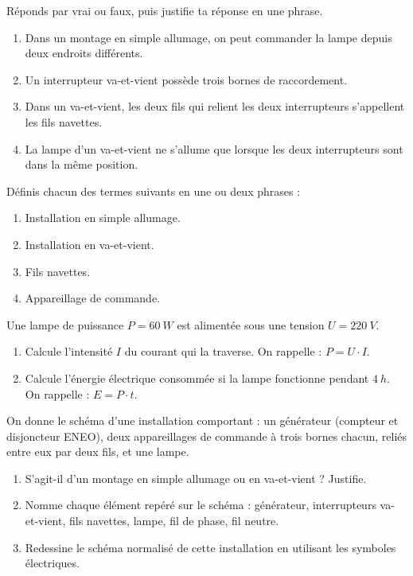 \documentclass[11pt]{article}
\newcounter{popsec}
\newcounter{popsub}
\newcommand{\courssub}[1]{%
  \stepcounter{popsub}%
  \par\vspace{9pt}\noindent{\popxbold\fontsize{11.5}{13}\selectfont\color{popink}{\color{poporange}\thepopsec.\thepopsub}\hspace{6pt}#1}\par\nopagebreak\vspace{4pt}
}
\begin{document}
\begin{exercice}
Réponds par vrai ou faux, puis justifie ta réponse en une phrase.
\begin{enumerate}
\item Dans un montage en simple allumage, on peut commander la lampe depuis deux endroits différents.
\item Un interrupteur va-et-vient possède trois bornes de raccordement.
\item Dans un va-et-vient, les deux fils qui relient les deux interrupteurs s'appellent les fils navettes.
\item La lampe d'un va-et-vient ne s'allume que lorsque les deux interrupteurs sont dans la même position.
\end{enumerate}
\end{exercice}

\begin{exercice}[Définitions]
Définis chacun des termes suivants en une ou deux phrases :
\begin{enumerate}
\item Installation en simple allumage.
\item Installation en va-et-vient.
\item Fils navettes.
\item Appareillage de commande.
\end{enumerate}
\end{exercice}

\begin{exercice}
Une lampe de puissance $P = \SI{60}{W}$ est alimentée sous une tension $U = \SI{220}{V}$.
\begin{enumerate}
\item Calcule l'intensité $I$ du courant qui la traverse. On rappelle : $P = U \cdot I$.
\item Calcule l'énergie électrique consommée si la lampe fonctionne pendant $\SI{4}{h}$. On rappelle : $E = P \cdot t$.
\end{enumerate}
\end{exercice}

\courssub{Je m'entraîne}

\begin{exercice}
On donne le schéma d'une installation comportant : un générateur (compteur et disjoncteur ENEO), deux appareillages de commande à trois bornes chacun, reliés entre eux par deux fils, et une lampe.
\begin{enumerate}
\item S'agit-il d'un montage en simple allumage ou en va-et-vient ? Justifie.
\item Nomme chaque élément repéré sur le schéma : générateur, interrupteurs va-et-vient, fils navettes, lampe, fil de phase, fil neutre.
\item Redessine le schéma normalisé de cette installation en utilisant les symboles électriques.
\end{enumerate}
\end{exercice}
\end{document}
